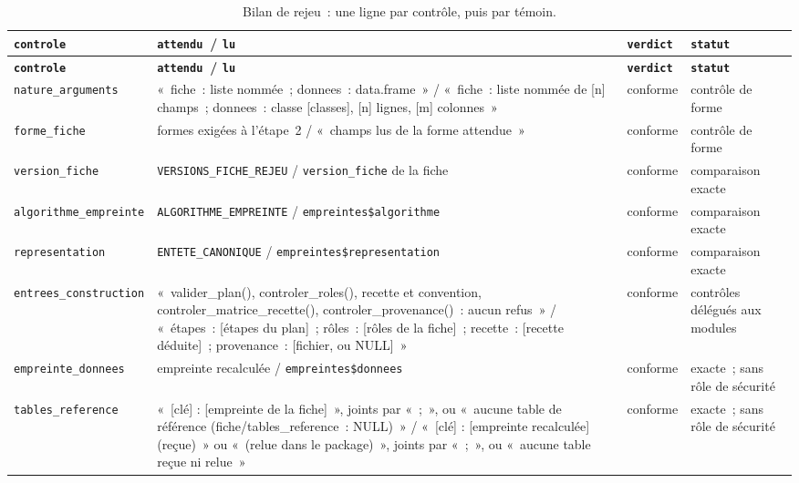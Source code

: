 \documentclass[a4paper,11pt]{article}
\newcommand{\code}[1]{\texttt{\small #1}}
\begin{document}
{\footnotesize
{}
\begin{longtable}{@{}p{4.8cm}p{5.1cm}p{2.2cm}p{2.5cm}@{}}
\caption{Bilan de rejeu~: une ligne par contrôle, puis par témoin.}
\label{tab:bilan-rejeu}\\
\rowcolor{tableheader}
\textcolor{financeblue}{\textbf{\code{controle}}} &
\textcolor{financeblue}{\textbf{\code{attendu}~/ \code{lu}}} &
\textcolor{financeblue}{\textbf{\code{verdict}}} &
\textcolor{financeblue}{\textbf{\code{statut}}} \\
\endfirsthead
\rowcolor{tableheader}
\textcolor{financeblue}{\textbf{\code{controle}}} &
\textcolor{financeblue}{\textbf{\code{attendu}~/ \code{lu}}} &
\textcolor{financeblue}{\textbf{\code{verdict}}} &
\textcolor{financeblue}{\textbf{\code{statut}}} \\
\endhead
\code{nature\_arguments} & «~fiche~: liste nommée~; donnees~: data.frame~» / «~fiche~: liste nommée de [n] champs~; donnees~: classe [classes], [n] lignes, [m] colonnes~» & conforme & contrôle de forme \\
\code{forme\_fiche} & formes exigées à l'étape~2 / «~champs lus de la forme attendue~» & conforme & contrôle de forme \\
\code{version\_fiche} & \code{VERSIONS\_FICHE\_REJEU} / \code{version\_fiche} de la fiche & conforme & comparaison exacte \\
\code{algorithme\_empreinte} & \code{ALGORITHME\_EMPREINTE} / \code{empreintes\$algorithme} & conforme & comparaison exacte \\
\code{representation} & \code{ENTETE\_CANONIQUE} / \code{empreintes\$representation} & conforme & comparaison exacte \\
\code{entrees\_construction} & «~valider\_plan(), controler\_roles(), recette et convention, controler\_matrice\_recette(), controler\_provenance()~: aucun refus~» / «~étapes~: [étapes du plan]~; rôles~: [rôles de la fiche]~; recette~: [recette déduite]~; provenance~: [fichier, ou NULL]~» & conforme & contrôles délégués aux modules \\
\code{empreinte\_donnees} & empreinte recalculée / \code{empreintes\$donnees} & conforme & exacte~; sans rôle de sécurité \\
\code{tables\_reference} & «~[clé] : [empreinte de la fiche]~», joints par «~;~», ou «~aucune table de référence (fiche/tables\_reference~: NULL)~» / «~[clé] : [empreinte recalculée] (reçue)~» ou «~(relue dans le package)~», joints par «~;~», ou «~aucune table reçue ni relue~» & conforme & exacte~; sans rôle de sécurité \\

\end{longtable}}
\end{document}
